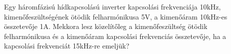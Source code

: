 \begin{example}

Egy háromfázisú hídkapcsolású inverter kapcsolási frekvenciája 10kHz, kimenőfeszültségének ötödik felharmónikusa 5V, a kimenőáram 10kHz-es összetevője 1A. Mekkora lesz közelítőleg a kimenőfeszültség ötödik felharmónikusa és a kimenőáram kapcsolási frekvenciás összetevője, ha a kapcsolási frekvenciát 15kHz-re emeljük? 

\tcbline
\vspace{1mm}

\solution

\end{example}